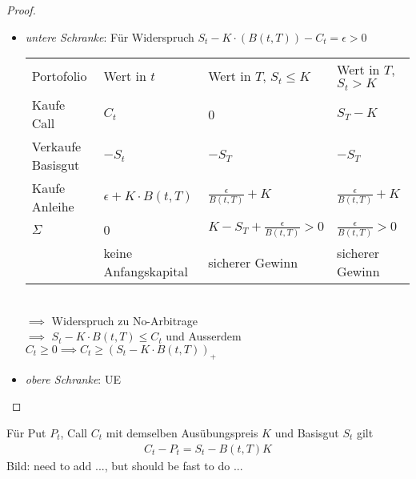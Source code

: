 \begin{proof}
	\begin{itemize}
		\item \emph{untere Schranke}: Für Widerspruch $S_t - K\cdot(B(t,T))-C_t = \epsilon > 0$\\
		\begin{tabular}{l|l|l|l} %
			Portofolio & Wert in $t$ & Wert in $T$, $S_t \le K$ & Wert in $T$, $S_t > K$\\
			Kaufe Call & $C_t$ & 0 & $S_T - K$\\
			Verkaufe Basisgut & $-S_t$ & $-S_T$ & $-S_T$\\
			Kaufe Anleihe & $\epsilon + K\cdot B(t,T)$ & $\frac{\epsilon}{B(t,T)}+K$ & $\frac{\epsilon}{B(t,T)} + K$\\
			$\Sigma$ & 0 & $K - S_T + \frac{\epsilon}{B(t,T)} > 0$ & $\frac{\epsilon}{B(t,T)} > 0$\\
			& keine Anfangskapital & sicherer Gewinn & sicherer Gewinn\\
		\end{tabular}\\
		$\implies$ Widerspruch zu No-Arbitrage\\
		$\implies$ $S_t - K\cdot B(t,T) \le C_t$ und Ausserdem $C_t \ge 0 \implies C_t \ge (S_t - K\cdot B(t,T))_+$
		\item \emph{obere Schranke}: UE
	\end{itemize}
\end{proof}
\begin{lemma} %
	Für Put $P_t$, Call $C_t$ mit demselben Ausübungspreis $K$ und Basisgut $S_t$ gilt
	\begin{align*}
		C_t - P_t = S_t - B(t,T)K
	\end{align*}
	Bild: need to add ..., but should be fast to do ...
\end{lemma}
